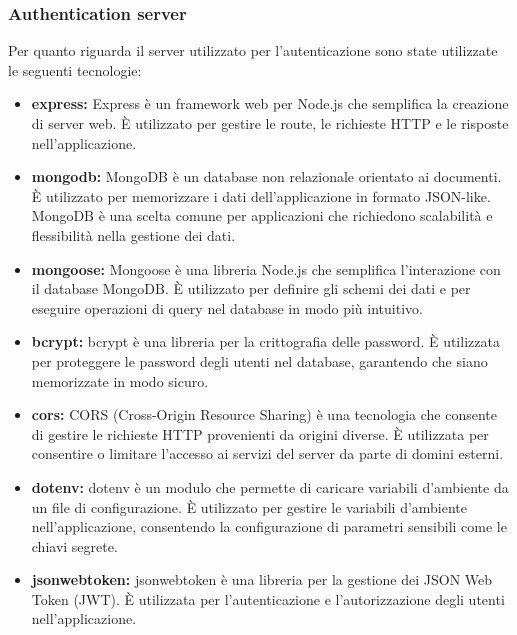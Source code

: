 \subsubsection{Authentication server}

Per quanto riguarda il server utilizzato per l'autenticazione sono state utilizzate le seguenti tecnologie:

\begin{itemize}

      \item \textbf{express:} Express è un framework web per Node.js che semplifica
            la creazione di server web. È utilizzato per gestire le route, le richieste
            HTTP e le risposte nell'applicazione.

      \item \textbf{mongodb:} MongoDB è un database non relazionale orientato ai
            documenti. È utilizzato per memorizzare i dati dell'applicazione in formato
            JSON-like. MongoDB è una scelta comune per applicazioni che richiedono scalabilità
            e flessibilità nella gestione dei dati.

      \item \textbf{mongoose:} Mongoose è una libreria Node.js che semplifica l'interazione
            con il database MongoDB. È utilizzato per definire gli schemi dei dati e per
            eseguire operazioni di query nel database in modo più intuitivo.

      \item \textbf{bcrypt:} bcrypt è una libreria per la crittografia delle password.
            È utilizzata per proteggere le password degli utenti nel database, garantendo che
            siano memorizzate in modo sicuro.

      \item \textbf{cors:} CORS (Cross-Origin Resource Sharing) è una tecnologia che
            consente di gestire le richieste HTTP provenienti da origini diverse. È utilizzata
            per consentire o limitare l'accesso ai servizi del server da parte di domini esterni.

      \item \textbf{dotenv:} dotenv è un modulo che permette di caricare variabili
            d'ambiente da un file di configurazione. È utilizzato per gestire le variabili
            d'ambiente nell'applicazione, consentendo la configurazione di parametri
            sensibili come le chiavi segrete.

      \item \textbf{jsonwebtoken:} jsonwebtoken è una libreria per la gestione dei
            JSON Web Token (JWT). È utilizzata per l'autenticazione e l'autorizzazione
            degli utenti nell'applicazione.

\end{itemize}

